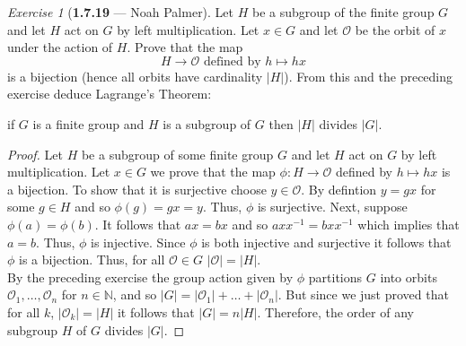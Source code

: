 \documentclass[12pt]{amsart}
\theoremstyle{remark}
\newtheorem*{exercise}{Exercise}%
\theoremstyle{mycomment}
\begin{document}
\begin{exercise}[\textbf{1.7.19} --- Noah Palmer] Let $H$ be a subgroup of the finite group $G$ and let $H$ act on $G$ by left multiplication. Let $x\in G$ and let $\mathcal{O}$ be the orbit of $x$ under the action of $H$. Prove that the map 
  $$H\to\mathcal{O}\text{  defined by  } h\mapsto hx$$
  is a bijection (hence all orbits have cardinality $|H|$). From this and the preceding exercise deduce Lagrange's Theorem:\\
  \begin{center}
  if $G$ is a finite group and $H$ is a subgroup of $G$ then $|H|$ divides $|G|$.
  \end{center}
  \begin{proof}
  Let $H$ be a subgroup of some finite group $G$ and let $H$ act on $G$ by left multiplication. Let $x\in G$ we prove that the map $\phi: H\to\mathcal{O}$ defined by $h\mapsto hx$ is a bijection. To show that it is surjective choose $y\in \mathcal{O}$. By defintion $y=gx$ for some $g\in H$ and so $\phi(g)=gx=y$. %
  Thus, $\phi$ is surjective. Next, suppose $\phi(a)=\phi(b)$. It follows that $ax=bx$ and so $axx^{-1}=bxx^{-1}$ which implies that $a=b$. Thus, $\phi$ is injective. Since $\phi$ is both injective and surjective it follows that $\phi$ is a bijection. Thus, for all $\mathcal{O}\in G$ $|\mathcal{O}|=|H|$.\\
  By the preceding exercise the group action given by $\phi$ partitions $G$ into orbits $\mathcal{O}_1,\ldots,\mathcal{O}_n$ for $n\in\mathbb{N}$, and so $|G|=|\mathcal{O}_1|+\ldots+|\mathcal{O}_n|$. But since we just proved that for all $k$, $|\mathcal{O}_k|=|H|$ it follows that $|G|=n|H|$. Therefore, the order of any subgroup $H$ of $G$ divides $|G|$.
  \end{proof}
  \end{exercise}
\vspace{.15in}
\end{document}
